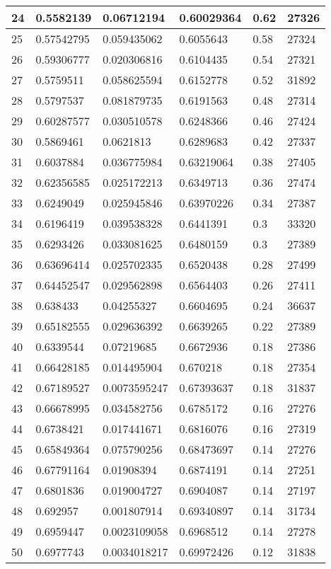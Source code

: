 \begin{longtable}{|l|l|l|l|l|l|}
24 & 0.5582139 & 0.06712194 & 0.60029364 & 0.62 & 27326 \\ \hline 
25 & 0.57542795 & 0.059435062 & 0.6055643 & 0.58 & 27324 \\ \hline 
26 & 0.59306777 & 0.020306816 & 0.6104435 & 0.54 & 27321 \\ \hline 
27 & 0.5759511 & 0.058625594 & 0.6152778 & 0.52 & 31892 \\ \hline 
28 & 0.5797537 & 0.081879735 & 0.6191563 & 0.48 & 27314 \\ \hline 
29 & 0.60287577 & 0.030510578 & 0.6248366 & 0.46 & 27424 \\ \hline 
30 & 0.5869461 & 0.0621813 & 0.6289683 & 0.42 & 27337 \\ \hline 
31 & 0.6037884 & 0.036775984 & 0.63219064 & 0.38 & 27405 \\ \hline 
32 & 0.62356585 & 0.025172213 & 0.6349713 & 0.36 & 27474 \\ \hline 
33 & 0.6249049 & 0.025945846 & 0.63970226 & 0.34 & 27387 \\ \hline 
34 & 0.6196419 & 0.039538328 & 0.6441391 & 0.3 & 33320 \\ \hline 
35 & 0.6293426 & 0.033081625 & 0.6480159 & 0.3 & 27389 \\ \hline 
36 & 0.63696414 & 0.025702335 & 0.6520438 & 0.28 & 27499 \\ \hline 
37 & 0.64452547 & 0.029562898 & 0.6564403 & 0.26 & 27411 \\ \hline 
38 & 0.638433 & 0.04255327 & 0.6604695 & 0.24 & 36637 \\ \hline 
39 & 0.65182555 & 0.029636392 & 0.6639265 & 0.22 & 27389 \\ \hline 
40 & 0.6339544 & 0.07219685 & 0.6672936 & 0.18 & 27386 \\ \hline 
41 & 0.66428185 & 0.014495904 & 0.670218 & 0.18 & 27354 \\ \hline 
42 & 0.67189527 & 0.0073595247 & 0.67393637 & 0.18 & 31837 \\ \hline 
43 & 0.66678995 & 0.034582756 & 0.6785172 & 0.16 & 27276 \\ \hline 
44 & 0.6738421 & 0.017441671 & 0.6816076 & 0.16 & 27319 \\ \hline 
45 & 0.65849364 & 0.075790256 & 0.68473697 & 0.14 & 27276 \\ \hline 
46 & 0.67791164 & 0.01908394 & 0.6874191 & 0.14 & 27251 \\ \hline 
47 & 0.6801836 & 0.019004727 & 0.6904087 & 0.14 & 27197 \\ \hline 
48 & 0.692957 & 0.001807914 & 0.69340897 & 0.14 & 31734 \\ \hline 
49 & 0.6959447 & 0.0023109058 & 0.6968512 & 0.14 & 27278 \\ \hline 
50 & 0.6977743 & 0.0034018217 & 0.69972426 & 0.12 & 31838 \\ \hline 
\end{longtable}